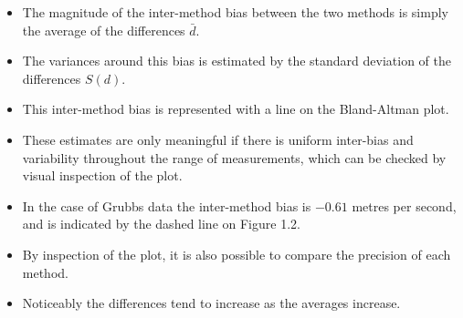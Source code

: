 \documentclass[compress]{beamer}        %
\begin{document}
\begin{frame}
\large
\begin{itemize}
\item The magnitude of the inter-method bias between the two methods is
simply the average of the differences $\bar{d}$.
\item The variances
around this bias is estimated by the standard deviation of the
differences $S(d)$. 
\item This inter-method bias is represented with a
line on the Bland-Altman plot. 
\item These estimates are only meaningful
if there is uniform inter-bias and variability throughout the
range of measurements, which can be checked by visual inspection
of the plot.
\end{itemize}
 
\end{frame}
\begin{frame}
\large
\begin{itemize}
\item 
In the case of Grubbs data the inter-method bias is
$-0.61$ metres per second, and is indicated by the dashed line on
Figure 1.2. 
\item By inspection of the plot, it is also possible to
compare the precision of each method. 
\item Noticeably the differences
tend to increase as the averages increase.
\end{itemize}
\end{frame}
\end{document}
